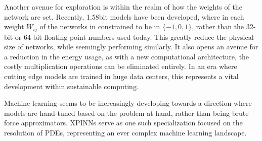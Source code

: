 Another avenue for exploration is within the realm of how the weights of the network are set.
Recently, 1.58bit models \cite{ma2024era} have been developed, where in each weight $W_{ij}$ of the networks in constrained to be in $\{-1, 0, 1\}$, rather than the 32-bit or 64-bit floating point numbers used today.
This greatly reduce the physical size of networks, while seemingly performing similarly.
It also opens an avenue for a reduction in the energy usage, as with a new computational architecture, the costly multiplication operations can be eliminated entirely.
In an era where cutting edge models are trained in huge data centers, this represents a vital development within sustainable computing.

Machine learning seems to be increasingly developing towards a direction where models are hand-tuned based on the problem at hand, rather than being brute force approximators.
XPINNs serve as one such specialization focused on the resolution of PDEs, representing an ever complex machine learning landscape.
